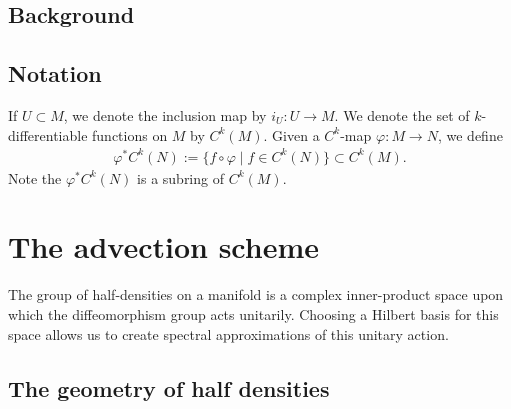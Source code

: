 \documentclass[12pt]{amsart}
\renewcommand{\phi}{\varphi}
\begin{document}
\subsection{Background}
\label{sec:background}

\subsection{Notation}
  If $U \subset M$, we denote the inclusion map by $i_U:U \to M$.
  We denote the set of $k$-differentiable functions on $M$ by $C^k(M)$.
  Given a $C^k$-map $\phi: M \to N$, we define
  \begin{align*}
    \phi^*C^k(N) := \{ f \circ \phi \mid f \in C^k(N) \} \subset C^k(M).
  \end{align*}
  Note the $\phi^*C^k(N)$ is a subring of $C^k(M)$.


\section{The advection scheme}
\label{sec:scheme}
The group of half-densities on a manifold is a complex inner-product
space upon which the diffeomorphism group acts unitarily.
Choosing a Hilbert basis for this space allows us to create spectral
approximations of this unitary action.

\subsection{The geometry of half densities}
\label{sec:half_densities}
\end{document}

